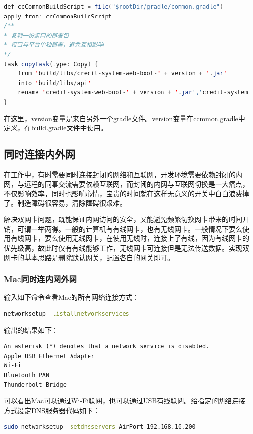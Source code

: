 \documentclass[letter]{book}
\begin{document}
\begin{lstlisting}[language=Java]
def ccCommonBuildScript = file("$rootDir/gradle/common.gradle")
apply from: ccCommonBuildScript
/**
* 复制一份接口的部署包
* 接口与平台单独部署，避免互相影响
*/
task copyTask(type: Copy) {
	from 'build/libs/credit-system-web-boot-' + version + '.jar'
	into 'build/libs/api'
	rename 'credit-system-web-boot-' + version + '.jar','credit-system-web-api-' + version + '.jar'
}
\end{lstlisting}

在这里，version变量是来自另外一个gradle文件。version变量在common.gradle中定义，在build.gradle文件中使用。

\subsection{同时连接内外网}

在工作中，有时需要同时连接封闭的网络和互联网，开发环境需要依赖封闭的内网，与远程的同事交流需要依赖互联网，而封闭的内网与互联网切换是一大痛点，不仅影响效率，同时也影响心情，宝贵的时间就在这样无意义的开关中白白浪费掉了。制造障碍很容易，清除障碍很艰难。

解决双网卡问题，既能保证内网访问的安全，又能避免频繁切换网卡带来的时间开销，可谓一举两得。一般的计算机有有线网卡，也有无线网卡。一般情况下要么使用有线网卡，要么使用无线网卡，在使用无线时，连接上了有线，因为有线网卡的优先级高，故此时仅有有线能够工作，无线网卡可连接但是无法传送数据。实现双网卡的基本思路是删除默认网关，配置各自的网关即可。

\subsubsection{Mac同时连内网外网}

输入如下命令查看Mac的所有网络连接方式：

\begin{lstlisting}[language=Bash]
networksetup -listallnetworkservices
\end{lstlisting}

输出的结果如下：

\begin{lstlisting}
An asterisk (*) denotes that a network service is disabled.
Apple USB Ethernet Adapter
Wi-Fi
Bluetooth PAN
Thunderbolt Bridge
\end{lstlisting}

可以看出Mac可以通过Wi-Fi联网，也可以通过USB有线联网。给指定的网络连接方式设定DNS服务器代码如下：

\begin{lstlisting}[language=Bash]
sudo networksetup -setdnsservers AirPort 192.168.10.200
\end{lstlisting}
\end{document}
